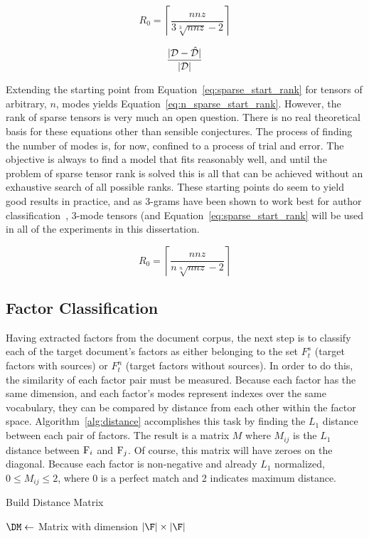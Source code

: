 \documentclass[../ut-dissertation.tex]{subfiles}
\begin{document}
\begin{equation}\label{eq:sparse_start_rank}
  R_0 = \left\lceil \displaystyle\frac{nnz}{3\sqrt[3]{nnz}-2} \right\rceil
  \end{equation}
  
\begin{equation}\label{eq:error_ratio}
  \displaystyle\frac{|\mathcal{D} - \mathcal{\hat{D}}|}{|\mathcal{D}|}
\end{equation}

Extending the starting point from Equation~\ref{eq:sparse_start_rank}
for tensors of arbitrary, $n$, modes yields
Equation~\ref{eq:n_sparse_start_rank}.  However, the rank of sparse
tensors is very much an open question.  There is no real theoretical
basis for these equations other than sensible conjectures.  The
process of finding the number of modes is, for now, confined to a
process of trial and error.  The objective is always to find a model
that fits reasonably well, and until the problem of sparse tensor rank
is solved this is all that can be achieved without an exhaustive
search of all possible ranks. These starting points do seem to yield
good results in practice, and as 3-grams have been shown to work best
for author classification~\cite{antonia2014}, 3-mode tensors (and
Equation~\ref{eq:sparse_start_rank} will be used in all of the
experiments in this dissertation.

\begin{equation}\label{eq:sparse_start_rank}
  R_0 = \left\lceil \displaystyle\frac{nnz}{n\sqrt[n]{nnz}-2} \right\rceil
\end{equation}


\subsection{Factor Classification}
Having extracted factors from the document corpus, the next step is to
classify each of the target document's factors as either belonging to
the set $F^s_t$ (target factors with sources) or $F^n_t$ (target
factors without sources).  In order to do this, the similarity of each
factor pair must be measured.  Because each factor has the same
dimension, and each factor's modes represent indexes over the same
vocabulary, they can be compared by distance from each other within
the factor space.  Algorithm~\ref{alg:distance} accomplishes this task
by finding the $L_1$ distance between each pair of factors.  The
result is a matrix $M$ where $M_{ij}$ is the $L_1$ distance between
$\mathrm{F}_i$ and $\mathrm{F}_j$.  Of course, this matrix will have zeroes
on the diagonal.  Because each factor is non-negative and already
$L_1$ normalized, $0 \leq M_{ij} \leq 2$, where 0 is a perfect match
and 2 indicates maximum distance.
\begin{algorithm}
  \caption{Build Distance Matrix}
  \label{alg:distance}
   
  \Input{\F}
  \Output{\DM}
  \BlankLine
  $\DM \leftarrow $ Matrix with dimension $|\F| \times |\F|$\;
  \Return{\DM}
\end{algorithm}
\end{document}
